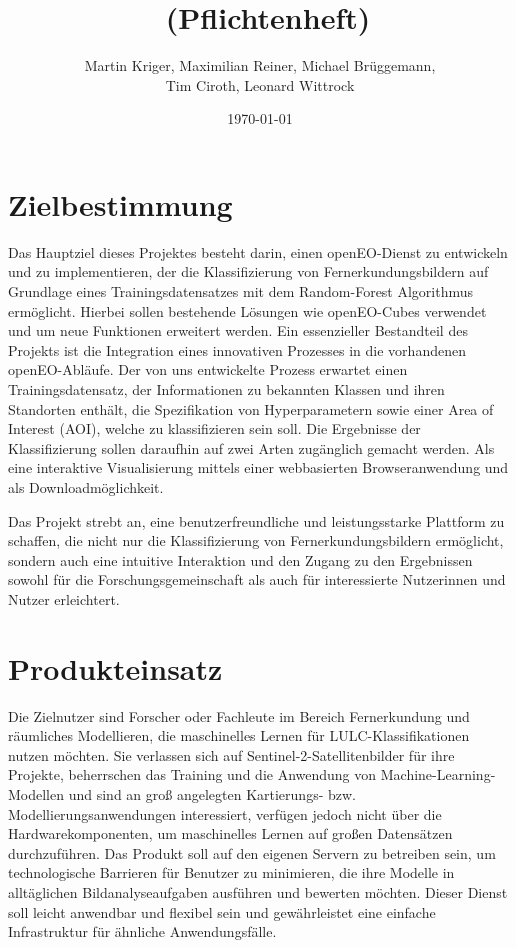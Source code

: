 \documentclass[a4paper,12pt]{article}
\title{\projektName~(Pflichtenheft)}
\author{Martin Kriger, Maximilian Reiner, Michael Brüggemann,\\ Tim Ciroth, Leonard Wittrock}
\date{\today}
\begin{document}
 \setcounter{page}{3}
 \tableofcontents          %
 \clearpage

\section{Zielbestimmung} \label{zielbestimmung}
Das Hauptziel dieses Projektes besteht darin, einen openEO-Dienst zu entwickeln und zu implementieren, der die Klassifizierung von Fernerkundungsbildern auf Grundlage eines Trainingsdatensatzes mit dem Random-Forest Algorithmus ermöglicht. Hierbei sollen bestehende Lösungen wie openEO-Cubes verwendet und um neue Funktionen erweitert werden. Ein essenzieller Bestandteil des Projekts ist die Integration eines innovativen Prozesses in die vorhandenen openEO-Abläufe. Der von uns entwickelte Prozess erwartet einen Trainingsdatensatz, der Informationen zu bekannten Klassen und ihren Standorten enthält, die Spezifikation von Hyperparametern sowie einer Area of Interest (AOI), welche zu klassifizieren sein soll. Die Ergebnisse der Klassifizierung sollen daraufhin auf zwei Arten zugänglich gemacht werden. Als eine interaktive Visualisierung mittels einer webbasierten Browseranwendung und als Downloadmöglichkeit.
\par
Das Projekt strebt an, eine benutzerfreundliche und leistungsstarke Plattform zu schaffen, die nicht nur die Klassifizierung von Fernerkundungsbildern ermöglicht, sondern auch eine intuitive Interaktion und den Zugang zu den Ergebnissen sowohl für die Forschungsgemeinschaft als auch für interessierte Nutzerinnen und Nutzer erleichtert.

\section{Produkteinsatz} \label{produkteinsatz}
Die Zielnutzer sind Forscher oder Fachleute im Bereich Fernerkundung und räumliches Modellieren, die maschinelles Lernen für LULC-Klassifikationen nutzen möchten. Sie verlassen sich auf Sentinel-2-Satellitenbilder für ihre Projekte, beherrschen das Training und die Anwendung von Machine-Learning-Modellen und sind an groß angelegten Kartierungs- bzw. Modellierungsanwendungen interessiert, verfügen jedoch nicht über die Hardwarekomponenten, um maschinelles Lernen auf großen Datensätzen durchzuführen. Das Produkt soll auf den eigenen Servern zu betreiben sein, um technologische Barrieren für Benutzer zu minimieren, die ihre Modelle in alltäglichen Bildanalyseaufgaben ausführen und bewerten möchten. Dieser Dienst soll leicht anwendbar und flexibel sein und gewährleistet eine einfache Infrastruktur für ähnliche Anwendungsfälle.
\end{document}
